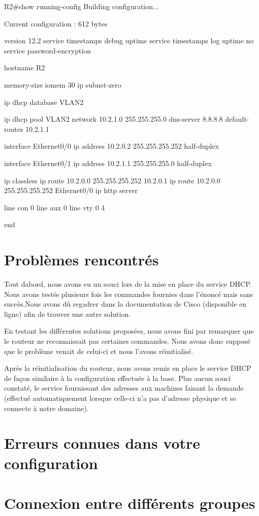 \documentclass{article}
\begin{document}
R2\#show running-config
Building configuration...

Current configuration : 612 bytes

version 12.2
service timestamps debug uptime
service timestamps log uptime
no service password-encryption

hostname R2

memory-size iomem 30
ip subnet-zero

ip dhcp database VLAN2

ip dhcp pool VLAN2
   network 10.2.1.0 255.255.255.0
   dns-server 8.8.8.8
   default-router 10.2.1.1

interface Ethernet0/0
 ip address 10.2.0.2 255.255.255.252
 half-duplex

interface Ethernet0/1
 ip address 10.2.1.1 255.255.255.0
 half-duplex

ip classless
ip route 10.2.0.0 255.255.255.252 10.2.0.1
ip route 10.2.0.0 255.255.255.252 Ethernet0/0
ip http server

line con 0
line aux 0
line vty 0 4

end

\section{Problèmes rencontrés}

Tout dabord, nous avons eu un souci lors de la mise en place du service DHCP. Nous avons testés
plusieurs fois les commandes fournies dans l'énoncé mais sans succès.Nous avons dû regadrer dans
la documentation de Cisco (disponible en ligne) afin de trouver une autre solution.

En testant les différentes solutions proposées, nous avons fini par remarquer que le routeur
ne reconnaissait pas certaines commandes. Nous avons donc supposé que le problème venait de celui-ci
et nous l'avons réinitialisé.

Après la réinitialisation du routeur, nous avons remis en place le service DHCP de façon similaire
à la configuration effectuée à la base. Plus aucun souci constaté, le service fournissant des adresses
aux machines faisant la demande (effectué automatiquement lorsque celle-ci n'a pas d'adresse physique et se connecte à notre domaine).
\section{Erreurs connues dans votre configuration}

\section{Connexion entre différents groupes}
\end{document}
